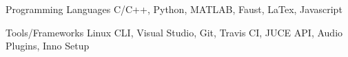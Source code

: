 

\begin{cvskills}

  \cvskill
    {Programming Languages} %
    {C/C++, Python, MATLAB, Faust, LaTex, Javascript} %

    \cvskill
    {Tools/Frameworks} %
    {Linux CLI, Visual Studio, Git, Travis CI, JUCE API, Audio Plugins, Inno Setup} %


\end{cvskills}
